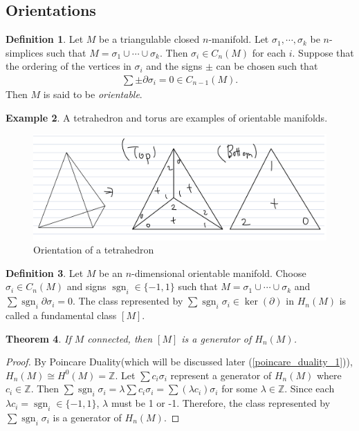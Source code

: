 \documentclass[psamsfonts]{amsart}
\newtheorem{thm}{Theorem}[section]
\theoremstyle{definition}
\newtheorem{defn}[thm]{Definition}
\newtheorem{exmp}[thm]{Example}
\theoremstyle{rem}
\DeclareMathOperator{\sgn}{sgn}
\numberwithin{equation}{section}
\begin{document}
\subsection{Orientations}

\begin{defn}
  Let $M$ be a triangulable closed $n$-manifold.
  Let $\sigma_1, \cdots, \sigma_k$ be $n$-simplices such that $M = \sigma_1 \cup \cdots \cup \sigma_k$.
  Then $\sigma_i \in C_n(M)$ for each $i$.
  Suppose that the ordering of the vertices in $\sigma_i$ and the signs $\pm$ can be chosen such that
  \begin{align*}
    \sum \pm \partial \sigma_i = 0 \in C_{n - 1}(M).
  \end{align*}
  Then $M$ is said to be \textit{orientable}.
\end{defn}

\begin{exmp}
  A tetrahedron and torus are examples of orientable manifolds.
  \begin{figure}[!htb]
    \includegraphics[width=.5\linewidth]{img/orientation_tetrahedron.jpeg}
    \caption{Orientation of a tetrahedron}
    \label{fig:orientation_tetrahedron}
  \end{figure}
\end{exmp}

\begin{defn}
  Let $M$ be an $n$-dimensional orientable manifold.
  Choose $\sigma_i \in C_n(M)$ and signs $\sgn_i \in \{ -1, 1 \}$ such that $M = \sigma_1 \cup \cdots \cup \sigma_k$ and $\sum \sgn_i \partial \sigma_i = 0$.
  The class represented by $\sum \sgn_i \sigma_i \in \ker(\partial)$ in $H_n(M)$ is called a fundamental class $[M]$.
\end{defn}

\begin{thm}\label{fundamental_class_generator}
  If $M$ connected, then $[M]$ is a generator of $H_n(M)$.
\end{thm}

\begin{proof}
  By Poincare Duality(which will be discussed later (\ref{poincare_duality_1})), $H_n(M) \cong H^0(M) = \mathbb{Z}$.
  Let $\sum c_i \sigma_i$ represent a generator of $H_n(M)$ where $c_i \in \mathbb{Z}$.
  Then $\sum \sgn_i \sigma_i = \lambda\sum c_i \sigma_i = \sum (\lambda c_i) \sigma_i$ for some $\lambda \in \mathbb{Z}$.
  Since each $\lambda c_i = \sgn_i \in \{ -1, 1 \}$, $\lambda$ must be 1 or -1.
  Therefore, the class represented by $\sum \sgn_i \sigma_i$ is a generator of $H_n(M)$.
\end{proof}
\end{document}

